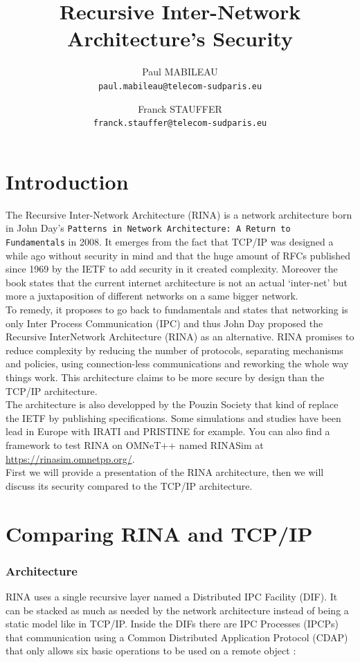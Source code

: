 \documentclass[a4paper]{proc}
\author{Paul MABILEAU\\\texttt{paul.mabileau@telecom-sudparis.eu}
        \and Franck STAUFFER\\\texttt{franck.stauffer@telecom-sudparis.eu}}
\title{\textbf{Recursive Inter-Network Architecture's Security}}
\begin{document}
\maketitle
\tableofcontents
\newpage
\part{Introduction}

The Recursive Inter-Network Architecture (RINA) is a network architecture born
in John Day's \texttt{Patterns in Network Architecture: A Return to
Fundamentals} in 2008.  It emerges from the fact that TCP/IP was designed a
while ago without security in mind and that the huge amount of RFCs\cite{rfc}
published since 1969 by the IETF to add security in it created
complexity.\cite{assessing-security} Moreover the book states that the current
internet architecture is not an actual `inter-net' but more a juxtaposition of
different networks on a same bigger network.  \\To remedy, it proposes to go
back to fundamentals and states that networking is only Inter Process
Communication (IPC) and thus John Day proposed the Recursive InterNetwork
Architecture (RINA) as an alternative.  RINA promises to reduce complexity by
reducing the number of protocols, separating mechanisms and policies, using
connection-less communications and reworking the whole way things work.  This
architecture claims to be more secure by design than the TCP/IP architecture.
\\The architecture is also developped by the Pouzin Society\cite{psoc} that kind
of replace the IETF by publishing specifications.  Some simulations and studies
have been lead in Europe with IRATI\cite{web:irati} and PRISTINE\cite{pristine}
for example.  You can also find a framework to test RINA on OMNeT++ named
RINASim at \url{https://rinasim.omnetpp.org/}.  \\First we will provide a
presentation of the RINA architecture, then we will discuss its security
compared to the TCP/IP architecture.

\newpage
\part{Comparing RINA and TCP/IP}
\section{Architecture}

RINA uses a single recursive layer named a Distributed IPC Facility (DIF). It
can be stacked as much as needed by the network architecture instead of being a
static model like in TCP/IP\@.  Inside the DIFs there are IPC Processes (IPCPs)
that communication using a Common Distributed Application Protocol (CDAP) that
only allows six basic operations to be used on a remote object
\cite{Trouva2011ISTI}:
\end{document}
